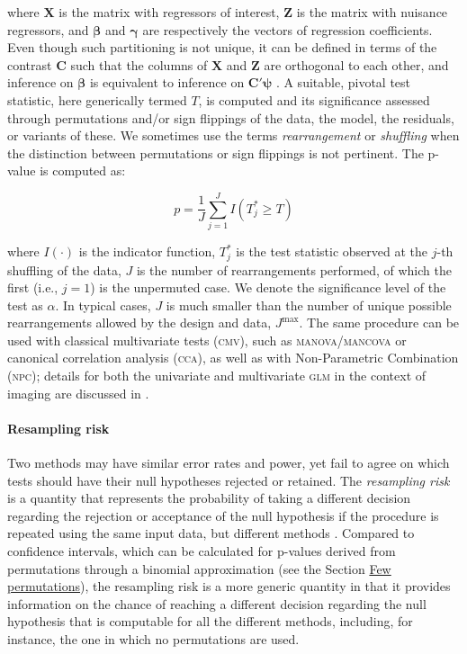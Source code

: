 \noindent
where $\mathbf{X}$ is the matrix with regressors of interest, $\mathbf{Z}$ is the matrix with nuisance regressors, and $\boldsymbol{\beta}$ and $\boldsymbol{\gamma}$ are respectively the vectors of regression coefficients. Even though such partitioning is not unique, it can be defined in terms of the contrast $\mathbf{C}$ such that the columns of $\mathbf{X}$ and $\mathbf{Z}$ are orthogonal to each other, and inference on $\boldsymbol{\beta}$ is equivalent to inference on $\mathbf{C}'\boldsymbol{\psi}$ \citep{Beckmann2001, Smith2007, Winkler2014}. A suitable, pivotal test statistic, here generically termed $T$, is computed and its significance assessed through permutations and/or sign flippings of the data, the model, the residuals, or variants of these. We sometimes use the terms \emph{rearrangement} or \emph{shuffling} when the distinction between permutations or sign flippings is not pertinent. The p-value is computed as:

\begin{equation}
p=\frac{1}{J}\sum_{j=1}^J I\left( T_j^{*} \geqslant T \right)
\label{eqn:pvalue}
\end{equation}

\noindent
where $I(\cdot)$ is the indicator function, $T_j^{*}$ is the test statistic observed at the $j$-th shuffling of the data, $J$ is the number of rearrangements performed, of which the first (i.e., $j=1$) is the unpermuted case. We denote the significance level of the test as $\alpha$. In typical cases, $J$ is much smaller than the number of unique possible rearrangements allowed by the design and data, $J^{\text{max}}$. The same procedure can be used with classical multivariate tests (\textsc{cmv}), such as \textsc{manova}/\textsc{mancova} or canonical correlation analysis (\textsc{cca}), as well as with Non-Parametric Combination (\textsc{npc}); details for both the univariate and multivariate \textsc{glm} in the context of imaging are discussed in \citet{Winkler2014, Winkler2016_npc}.

\paragraph{Resampling risk} Two methods may have similar error rates and power, yet fail to agree on which tests should have their null hypotheses rejected or retained. The \emph{resampling risk} is a quantity that represents the probability of taking a different decision regarding the rejection or acceptance of the null hypothesis if the procedure is repeated using the same input data, but different methods \citep{Jockel1984}. Compared to confidence intervals, which can be calculated for p-values derived from permutations through a binomial approximation (see the Section \href{sec:accel:fewperms}{Few permutations}), the resampling risk is a more generic quantity in that it provides information on the chance of reaching a different decision regarding the null hypothesis that is computable for all the different methods, including, for instance, the one in which no permutations are used.

